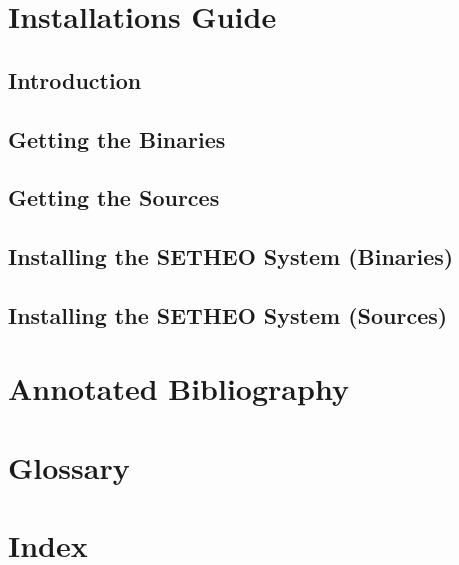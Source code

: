 \chapter{Installations Guide}
\section{Introduction}
\section{Getting the Binaries}
\section{Getting the Sources}
\section{Installing the SETHEO System (Binaries)}
\section{Installing the SETHEO System (Sources)}

\appendix
\chapter*{Annotated Bibliography}

\chapter*{Glossary}

\chapter*{Index}


